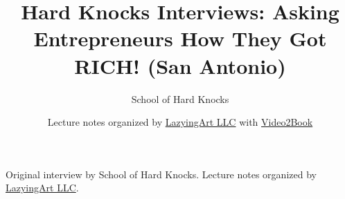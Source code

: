 \documentclass[11pt,oneside]{book}
\begin{document}
\frontmatter
\title{Hard Knocks Interviews: Asking Entrepreneurs How They Got RICH! (San Antonio)}
\author{School of Hard Knocks}
\date{Lecture notes organized by \href{https://lazying.art}{LazyingArt LLC} with \href{https://github.com/lachlanchen/Video2Book}{Video2Book}}
\maketitle
\begin{center}
\small Original interview by School of Hard Knocks. Lecture notes organized by \href{https://lazying.art}{LazyingArt LLC}.
\end{center}
\clearpage
\mainmatter

\end{document}
